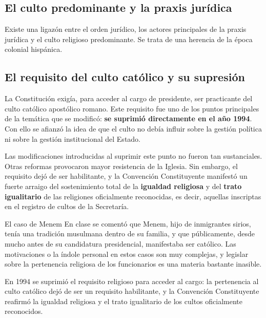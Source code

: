 \documentclass[12pt,oneside]{book}
\begin{document}
\subsection{El culto predominante y la praxis jurídica}

Existe una ligazón entre el orden jurídico, los actores principales de la praxis jurídica y el culto religioso predominante. Se trata de una herencia de la época colonial hispánica.

\subsection{El requisito del culto católico y su supresión}

La Constitución exigía, para acceder al cargo de presidente, ser practicante del culto católico apostólico romano. Este requisito fue uno de los puntos principales de la temática que se modificó: \textbf{se suprimió directamente en el año 1994}. Con ello se afianzó la idea de que el culto no debía influir sobre la gestión política ni sobre la gestión institucional del Estado.


Las modificaciones introducidas al suprimir este punto no fueron tan sustanciales. Otras reformas provocaron mayor resistencia de la Iglesia. Sin embargo, el requisito dejó de ser habilitante, y la Convención Constituyente manifestó un fuerte arraigo del sostenimiento total de la \textbf{igualdad religiosa} y del \textbf{trato igualitario} de las religiones oficialmente reconocidas, es decir, aquellas inscriptas en el registro de cultos de la Secretaría.

\begin{example}{El caso de Menem}
En clase se comentó que Menem, hijo de inmigrantes sirios, tenía una tradición musulmana dentro de su familia, y que públicamente, desde mucho antes de su candidatura presidencial, manifestaba ser católico. Las motivaciones o la índole personal en estos casos son muy complejas, y legislar sobre la pertenencia religiosa de los funcionarios es una materia bastante inasible.
\end{example}

\begin{important}
En 1994 se suprimió el requisito religioso para acceder al cargo: la pertenencia al culto católico dejó de ser un requisito habilitante, y la Convención Constituyente reafirmó la igualdad religiosa y el trato igualitario de los cultos oficialmente reconocidos.
\end{important}
\end{document}
